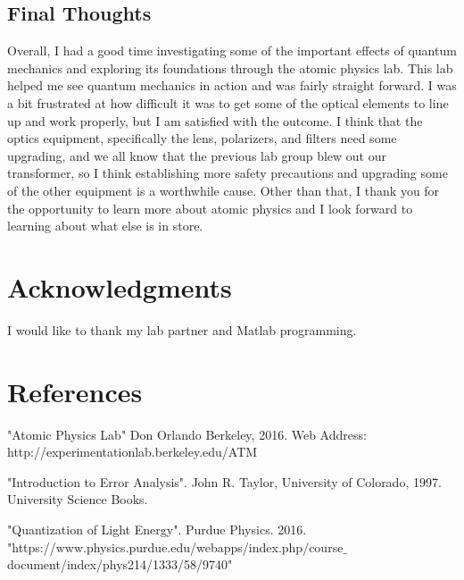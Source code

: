 \documentclass{article}
\begin{document}
    \subsection{Final Thoughts}
    Overall, I had a good time investigating some of the important effects of quantum mechanics and exploring its foundations through the atomic physics lab. This lab helped me see quantum mechanics in action and was fairly straight forward. I was a bit frustrated at how difficult it was to get some of the optical elements to line up and work properly, but I am satisfied with the outcome. I think that the optics equipment, specifically the lens, polarizers, and filters need some upgrading, and we all know that the previous lab group blew out our transformer, so I think establishing more safety precautions and upgrading some of the other equipment is a worthwhile cause. Other than that, I thank you for the opportunity to learn more about atomic physics and I look forward to learning about what else is in store.

\section{Acknowledgments}

I would like to thank my lab partner and Matlab programming.

\section{References}

\begin{thebibliography}{1}

   "Atomic Physics Lab" Don Orlando Berkeley, 2016. Web Address: http://experimentationlab.berkeley.edu/ATM 

    "Introduction to Error Analysis". John R. Taylor, University of Colorado, 1997. University Science Books.

   "Quantization of Light Energy". Purdue Physics. 2016. "https://www.physics.purdue.edu/webapps/index.php/course$\_$document/index/phys214/1333/58/9740"

  \end{thebibliography}
\end{document}
